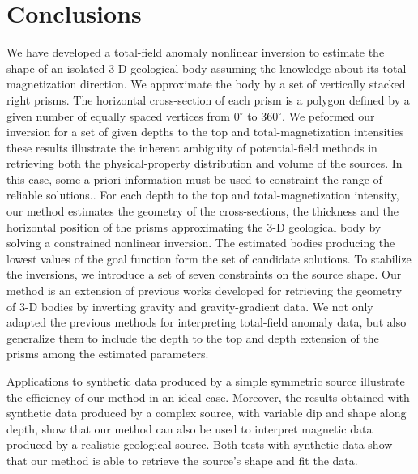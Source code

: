 \section{Conclusions}

We have developed a total-field anomaly nonlinear inversion to estimate the shape 
of an isolated 3-D geological body assuming the knowledge about its 
total-magnetization direction. We approximate the body by a set of vertically 
stacked right prisms. The horizontal cross-section of each prism is a polygon 
defined by a given number of equally spaced vertices from 0$^\circ$ to 360$^\circ$. 
We peformed our inversion for a set of given depths to the top and total-magnetization 
intensities these results illustrate the inherent ambiguity of potential-field methods in 
retrieving both the physical-property distribution and volume of the sources. 
In this case, some a priori information must 
be used to constraint the range of reliable solutions.. For each depth to the top and total-magnetization intensity,
our method estimates the geometry of the cross-sections, the thickness and 
the horizontal position of the prisms approximating the 3-D geological body by 
solving a constrained nonlinear inversion.
The estimated bodies producing the lowest values of the goal function form the 
set of candidate solutions. 
To stabilize the inversions, we introduce a set of seven constraints on the source 
shape.
Our method is an extension of previous works developed for retrieving the geometry 
of 3-D bodies by inverting gravity and gravity-gradient data. 
We not only adapted the previous methods for interpreting total-field anomaly data,
but also generalize them to include the depth to the top and depth extension of 
the prisms among the estimated parameters.

Applications to synthetic data produced by a simple symmetric source 
illustrate the efficiency of our method in an ideal case. Moreover, the results 
obtained with synthetic data produced by a complex source, with variable dip and 
shape along depth, show that our method can also be used to interpret magnetic 
data produced by a realistic geological source. 
Both tests with synthetic data show that our method is able to retrieve the 
source's shape and fit the data.

